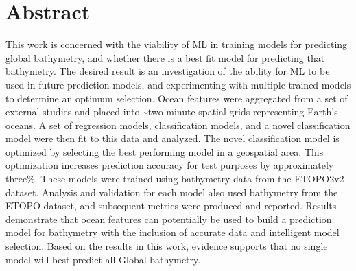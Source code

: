 \section{Abstract}
\setlength{\parindent}{10ex}
This work is concerned with the viability of \ac{ML} in training models for predicting global bathymetry, and whether there is a best fit model for predicting that bathymetry.
The desired result is an investigation of the ability for \ac{ML} to be used in future prediction models, and experimenting with multiple trained models to determine an optimum selection.
Ocean features were aggregated from a set of external studies and placed into \~{}two minute spatial grids representing Earth's oceans.
A set of regression models, classification models, and a novel classification model were then fit to this data and analyzed.
The novel classification model is optimized by selecting the best performing model in a geospatial area.
This optimization increases prediction accuracy for test purposes by approximately three\%.
These models were trained using bathymetry data from the ETOPO2v2 dataset.
Analysis and validation for each model also used bathymetry from the ETOPO dataset, and subsequent metrics were produced and reported.
Results demonstrate that ocean features can potentially be used to build a prediction model for bathymetry with the inclusion of accurate data and intelligent model selection.
Based on the results in this work, evidence supports that no single model will best predict all Global bathymetry.
